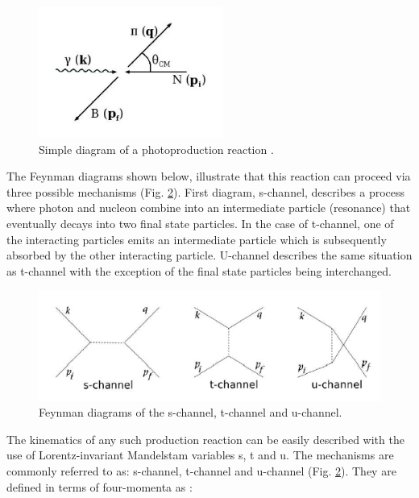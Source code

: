 \begin{figure}[H]
\begin{center}
\includegraphics[scale=0.8]{pictures/png/photorea.png}
\caption{Simple diagram of a photoproduction reaction \cite{jo}.}
\label{photorea}
\end{center}
\end{figure}

\indent The Feynman diagrams shown below, illustrate that this reaction can proceed via three possible mechanisms (Fig. \ref{mandelstam}). First diagram, s-channel, describes a process where photon and nucleon combine into an intermediate particle (resonance) that eventually decays into two final state particles. In the case of t-channel, one of the interacting particles emits an intermediate particle which is subsequently absorbed by the other interacting particle. U-channel describes the same situation as t-channel with the exception of the final state particles being interchanged.

\begin{figure}[H]
\begin{center}
\includegraphics[scale=0.7]{pictures/png/mandelstam.png}
\caption{Feynman diagrams of the s-channel, t-channel and u-channel.}
\label{mandelstam}
\end{center}
\end{figure}

\indent The kinematics of any such production reaction can be easily described with the use of Lorentz-invariant Mandelstam variables s, t and u. The mechanisms are commonly referred to as: s-channel, t-channel and u-channel (Fig. \ref{mandelstam}). They are defined in terms of four-momenta as \cite{walker}:

